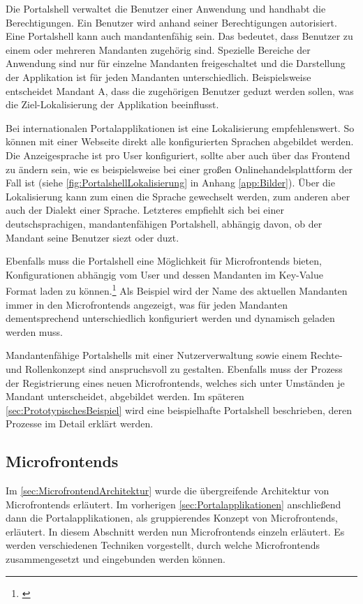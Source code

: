 Die Portalshell verwaltet die Benutzer einer Anwendung und handhabt die Berechtigungen. Ein Benutzer wird anhand seiner Berechtigungen autorisiert. Eine Portalshell kann auch mandantenfähig sein. Das bedeutet, dass Benutzer zu einem oder mehreren Mandanten zugehörig sind. Spezielle Bereiche der Anwendung sind nur für einzelne Mandanten freigeschaltet und die Darstellung der Applikation ist für jeden Mandanten unterschiedlich. Beispielsweise entscheidet Mandant A, dass die zugehörigen Benutzer geduzt werden sollen, was die Ziel-Lokalisierung der Applikation beeinflusst.

Bei internationalen Portalapplikationen ist eine Lokalisierung empfehlenswert. So können mit einer Webseite direkt alle konfigurierten Sprachen abgebildet werden. Die Anzeigesprache ist pro User konfiguriert, sollte aber auch über das Frontend zu ändern sein, wie es beispielsweise bei einer großen Onlinehandelsplattform der Fall ist (siehe \cref{fig:PortalshellLokalisierung} in Anhang \ref{app:Bilder}). Über die Lokalisierung kann zum einen die Sprache gewechselt werden, zum anderen aber auch der Dialekt einer Sprache. Letzteres empfiehlt sich bei einer deutschsprachigen, mandantenfähigen Portalshell, abhängig davon, ob der Mandant seine Benutzer siezt oder duzt.

Ebenfalls muss die Portalshell eine Möglichkeit für Microfrontends bieten, Konfigurationen abhängig vom User und dessen Mandanten im Key-Value Format laden zu können.\footnote{\cite[vgl.][46]{Mezzalira2021}} Als Beispiel wird der Name des aktuellen Mandanten immer in den Microfrontends angezeigt, was für jeden Mandanten dementsprechend unterschiedlich konfiguriert werden und dynamisch geladen werden muss.

Mandantenfähige Portalshells mit einer Nutzerverwaltung sowie einem Rechte- und Rollenkonzept sind anspruchsvoll zu gestalten. Ebenfalls muss der Prozess der Registrierung eines neuen Microfrontends, welches sich unter Umständen je Mandant unterscheidet, abgebildet werden. Im späteren \cref{sec:PrototypischesBeispiel} wird eine beispielhafte Portalshell beschrieben, deren Prozesse im Detail erklärt werden.

\subsection{Microfrontends}\label{sec:Microfrontends}

Im \cref{sec:MicrofrontendArchitektur} wurde die übergreifende Architektur von Microfrontends erläutert. Im vorherigen \cref{sec:Portalapplikationen} anschließend dann die Portalapplikationen, als gruppierendes Konzept von Microfrontends, erläutert. In diesem Abschnitt werden nun Microfrontends einzeln erläutert. Es werden verschiedenen Techniken vorgestellt, durch welche Microfrontends zusammengesetzt und eingebunden werden können.

